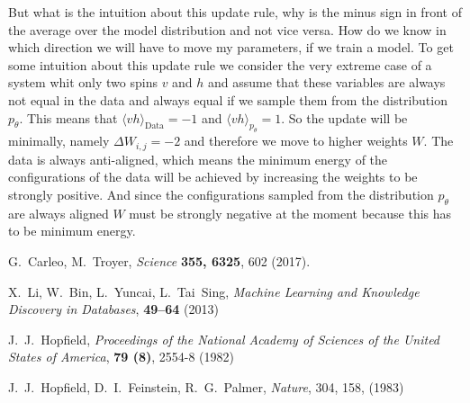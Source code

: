 \documentclass[nofootinbib, superscriptaddress, prl]{revtex4}
\begin{document}
But what is the intuition about this update rule, why is the minus sign in front of the average over the model distribution and not vice versa. How do we know in which direction we will have to move my parameters, if we train a model.
To get some intuition about this update rule we consider the very extreme case of a system whit only two spins $v$ and $h$ and assume that these variables are always not equal in the data and always equal if we sample them from the distribution $p_{\theta}$. This means that $\langle v h \rangle_{\text{Data}} = -1$
 and $\langle v h \rangle_{p_{\theta}}  = 1$. So the update will be minimally, namely $\Delta W_{i,j} = -2$ and therefore we move to higher weights $W$. The data is always anti-aligned, which means the minimum energy of the configurations of the data will be achieved by increasing the weights to be strongly positive. And since the configurations sampled from the distribution $p_{\theta}$ are always aligned $W$ must be strongly negative at the moment because this has to be minimum energy.
 
\begin{thebibliography}{10}

G.~Carleo, M.~Troyer, {\it Science\/} {\bf 355, 6325}, 602
  (2017).

X.~Li, W.~Bin, L.~Yuncai, L.~Tai~Sing, {\it Machine Learning and Knowledge Discovery in Databases}, {\bf 49--64} (2013)

J.~J.~Hopfield, {\it Proceedings of the National Academy of Sciences of the United States of America}, {\bf 79 (8)}, 2554-8 (1982) 

J.~J.~Hopfield, D.~I.~Feinstein, R.~G.~Palmer, {\it Nature}, {304}, 158, (1983)


\end{thebibliography} 
\end{document}
